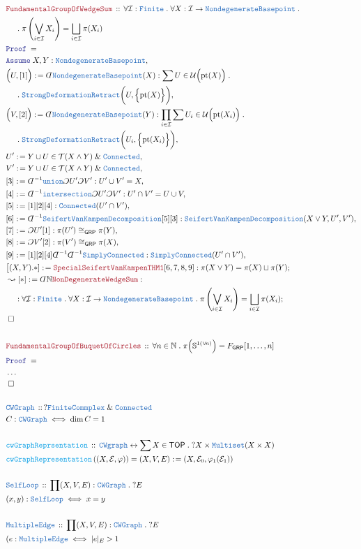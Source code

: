 \documentclass[12pt]{scrartcl}
\newcommand{\TYPE}[1]{\textcolor{NavyBlue}{\mathtt{#1}}}
\newcommand{\FUNC}[1]{\textcolor{Cerulean}{\mathtt{#1}}}
\newcommand{\LOGIC}[1]{\textcolor{Blue}{\mathtt{#1}}}
\newcommand{\THM}[1]{\textcolor{Maroon}{\mathtt{#1}}}
\renewcommand{\.}{\; . \;}
\newcommand{\de}{: \kern 0.1pc =}
\newcommand{\Act}[1]{\left( #1 \right)}
\newcommand{\Theorem}[2]{& \THM{#1} \, :: \, #2 \\ & \Proof = \\ }
\newcommand{\DeclareType}[2]{& \TYPE{#1} \, :: \, #2 \\}
\newcommand{\DefineType}[3]{& #1 : \TYPE{#2} \iff #3 \\}
\newcommand{\DeclareFunc}[2]{& \FUNC{#1} \, :: \, #2 \\}
\newcommand{\DefineNamedFunc}[4]{&  \FUNC{#1}\Act{#2} = #3 \de #4 \\}
\newcommand{\NewLine}{\\ & \kern 1pc}
\newcommand{\Page}[1]{ \begin{align*} #1 \end{align*}   }
\newcommand{ \bd }{ \ByDef }
\newcommand{\NoProof}{ & \ldots \\ \EndProof}
\renewcommand{\And}{\; \& \;}
\newcommand{\Sphere}{\mathbb{S}}
\newcommand{\Nat}{\mathbb{N} }
\newcommand{\ToBij}{\leftrightarrow}
\newcommand{\Say}[3]{& #1 \de #2 : #3, \\}
\newcommand{\SayIn}[3]{& #1 \de #2 \in #3, \\}
\newcommand{\Conclude}[3]{& #1 \de #2 : #3; \\}
\newcommand{\DeriveConclude}[3]{& \leadsto #1 \de #2 : #3 ; \\}
\newcommand{\Assume}[2]{& \LOGIC{Assume} \; #1 : #2, \\}
\newcommand{\QED}{\; \square}
\newcommand{\EndProof}{& \QED \\}
\newcommand{\ByDef}{\rotatebox[origin=c]{-180}{$D$}}%
\newcommand{\ByConstr}{\rotatebox[origin=c]{-180}{$C$}}%
\newcommand{\Proof}{\LOGIC{Proof} \; }
\newcommand{\I}{\mathcal{I}}
\newcommand{\TOP}{\mathsf{TOP}}
\newcommand{\T}{\mathcal{T}}
\newcommand{\U}{\mathcal{U}}
\newcommand{\GRP}{\mathsf{GRP}}
\newcommand{\SVKD}{\TYPE{SeifertVanKampenDecomposition}}
\newcommand{\E}{\mathcal{E}}
\begin{document}
\Page{
	\Theorem{FundamentalGroupOfWedgeSum}
	{
		\forall \I  : \TYPE{Finite}  \.
		\forall X : \I \to \TYPE{NondegenerateBasepoint} \. \NewLine \. 
		\pi \left(\bigvee_{i \in \I} X_i\right) = 
		\bigsqcup_{i \in \I}  \pi(X_i)   
	}
	\Assume{X,Y}{\TYPE{NondegenerateBasepoint}}
	\Say{\Big(U,[1]\Big)}
	{
		\bd \TYPE{NondegenerateBasepoint}(X)
	}
	{
		\sum U \in \U\Big(\mathrm{pt}(X)\Big) \. \NewLine \.  
		\TYPE{StrongDeformationRetract}\bigg( U,\Big\{ \mathrm{pt}(X) \Big\}  \bigg)   
	}
	\Say{\Big(V,[2]\Big)}
	{
		\bd \TYPE{NondegenerateBasepoint}(Y)
	}
	{
		\prod_{i \in \I} \sum U_i \in \U\Big(\mathrm{pt}(X_i)\Big) \. \NewLine \.  
		\TYPE{StrongDeformationRetract}\bigg( U_i,\Big\{ \mathrm{pt}(X_i) \Big\}  \bigg)   
	}
	\SayIn{U'}{Y \cup U}{\T(X \wedge Y) \And \TYPE{Connected}} 
	\SayIn{V'}{Y \cup U}{\T(X \wedge Y) \And \TYPE{Connected}} 
	\Say{[3]}{\bd^{-1} \TYPE{union}\ByConstr U' \ByConstr V'}{ U' \cup V' = X}
	\Say{[4]}{\bd^{-1}\TYPE{intersection}\ByConstr U' \ByConstr V'}{ U' \cap V' = U \cup V}
	\Say{[5]}{[1][2][4]}{\TYPE{Connected}(U' \cap V')}
	\Say{[6]}{\bd^{-1} \SVKD [5][3]}{\SVKD(X\vee Y,U',V')}
	\Say{[7]}{\ByConstr U' [1]}{\pi(U') \cong_\GRP \pi(Y)}
	\Say{[8]}{\ByConstr V' [2]}{\pi(V') \cong_\GRP \pi(X)}
	\Say{[9]}{[1][2][4]\bd^{-1} \bd^{-1} \TYPE{SimplyConnected}}{\TYPE{SimplyConnected}(U' \cap V' )}
	\Conclude{\big[(X,Y).*]}{\THM{SpecialSeifertVanKampenTHM1}[6,7,8,9]}
	{
		\pi(X \vee Y) = \pi(X) \sqcup \pi(Y)
	}
	\DeriveConclude{[*]}{\bd \Nat \THM{NonDegenerateWedgeSum}}
	{
		\NewLine : 
		\forall \I  : \TYPE{Finite}  \.
		\forall X : \I \to \TYPE{NondegenerateBasepoint} \. 
		\pi \left(\bigvee_{i \in \I} X_i\right) = 
		\bigsqcup_{i \in \I}  \pi(X_i)   
	}
	\EndProof
	\\
	\Theorem{FundamentalGroupOfBuquetOfCircles}
	{
		\forall n \in \Nat \. 
		\pi\Big( \Sphere^{1(\vee \! n)} \Big) = F_{\GRP}[1,\ldots,n] 
	}
	\NoProof
	\\
	\DeclareType{CWGraph}{?\TYPE{FiniteCommplex} \And \TYPE{Connected} }
	\DefineType{C}{CWGraph}{ \dim C = 1  }
	\\
	\DeclareFunc{cwGraphReprsentation}{\TYPE{CWgraph} \ToBij \sum X \in \TOP \. ?X \times \TYPE{Multiset}(X \times X)}
	\DefineNamedFunc{cwGraphRepresentation}{ (X,\E,\varphi)}{(X,V,E)}{(X,\E_0,\varphi_1(\E_1))}
	\\
	\DeclareType{SelfLoop}{\prod (X,V,E) : \TYPE{CWGraph} \. ?E}
	\DefineType{(x,y)}{SelfLoop}{x = y}
	\\
	\DeclareType{MultipleEdge}{\prod (X,V,E) : \TYPE{CWGraph} \. ?E}
	\DefineType{(e}{MultipleEdge}{|e|_E > 1}
}
\end{document}
